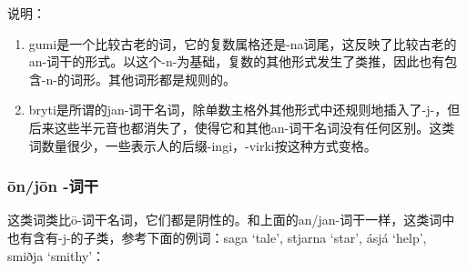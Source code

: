 说明：

\begin{enumerate}
  \def\labelenumi{\arabic{enumi})}
  \item
        gumi是一个比较古老的词，它的复数属格还是-na词尾，这反映了比较古老的an-词干的形式。以这个-n-为基础，复数的其他形式发生了类推，因此也有包含-n-的词形。其他词形都是规则的。
  \item
        bryti是所谓的jan-词干名词，除单数主格外其他形式中还规则地插入了-j-，但后来这些半元音也都消失了，使得它和其他an-词干名词没有任何区别。这类词数量很少，一些表示人的后缀-ingi，-virki按这种方式变格。
\end{enumerate}

\subsubsection{ōn/jōn -词干}\label{onjon--ux8bcdux5e72}

这类词类比ō-词干名词，它们都是阴性的。和上面的an/jan-词干一样，这类词中也有含有-j-的子类，参考下面的例词：saga
`tale', stjarna `star', ásjá `help', smiðja `smithy'：

